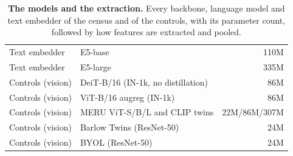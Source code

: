 \begin{table}[H]
\begin{tabular}{llr}
Text embedder & E5-base \citep{e5} & 110M \\
Text embedder & E5-large \citep{e5} & 335M \\
\midrule
Controls (vision) & DeiT-B/16 (IN-1k, no distillation) \citep{deit} & 86M \\
Controls (vision) & ViT-B/16 augreg (IN-1k) \citep{augreg} & 86M \\
Controls (vision) & MERU ViT-S/B/L and CLIP twins \citep{desai2023meru} & 22M/86M/307M \\
Controls (vision) & Barlow Twins (ResNet-50) \citep{zbontar2021barlow} & 24M \\
Controls (vision) & BYOL (ResNet-50) \citep{grill2020bootstrap} & 24M \\
\bottomrule
\end{tabular}
\par\vspace{2pt}
\caption{\textbf{The models and the extraction.} Every backbone, language model and text embedder of the census and of the controls, with its parameter count, followed by how features are extracted and pooled.
}
\label{tab:q14-panel}
\end{table}
